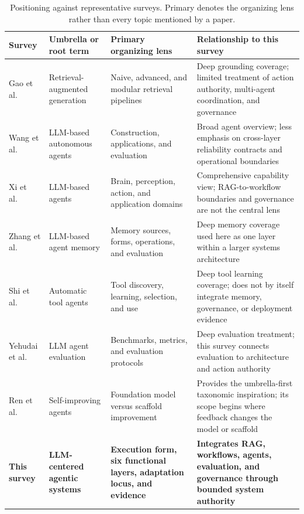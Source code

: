 \begin{table}[t]
\centering
\caption{Positioning against representative surveys. Primary denotes the organizing lens rather than every topic mentioned by a paper.}
\label{tab:related-surveys}
\small
\surveytableformat
\begin{tabularx}{\textwidth}{L{3.0cm}L{3.1cm}L{3.5cm}Y}
\toprule
{}\textbf{Survey} & \textbf{Umbrella or root term} & \textbf{Primary organizing lens} & \textbf{Relationship to this survey} \\
\midrule
Gao et al.~\cite{gao2023ragsurvey} & Retrieval-augmented generation & Naive, advanced, and modular retrieval pipelines & Deep grounding coverage; limited treatment of action authority, multi-agent coordination, and governance \\
Wang et al.~\cite{wang2024autonomousagentssurvey} & LLM-based autonomous agents & Construction, applications, and evaluation & Broad agent overview; less emphasis on cross-layer reliability contracts and operational boundaries \\
Xi et al.~\cite{xi2025agentsurvey} & LLM-based agents & Brain, perception, action, and application domains & Comprehensive capability view; RAG-to-workflow boundaries and governance are not the central lens \\
Zhang et al.~\cite{zhang2025memorysurvey} & LLM-based agent memory & Memory sources, forms, operations, and evaluation & Deep memory coverage used here as one layer within a larger systems architecture \\
Shi et al.~\cite{shi2025toollearning} & Automatic tool agents & Tool discovery, learning, selection, and use & Deep tool learning coverage; does not by itself integrate memory, governance, or deployment evidence \\
Yehudai et al.~\cite{yehudai2026agentsurveyeval} & LLM agent evaluation & Benchmarks, metrics, and evaluation protocols & Deep evaluation treatment; this survey connects evaluation to architecture and action authority \\
Ren et al.~\cite{ren2026selfimprovingagents} & Self-improving agents & Foundation model versus scaffold improvement & Provides the umbrella-first taxonomic inspiration; its scope begins where feedback changes the model or scaffold \\
\textbf{This survey} & \textbf{LLM-centered agentic systems} & \textbf{Execution form, six functional layers, adaptation locus, and evidence} & \textbf{Integrates RAG, workflows, agents, evaluation, and governance through bounded system authority} \\
\bottomrule
\end{tabularx}
\end{table}

